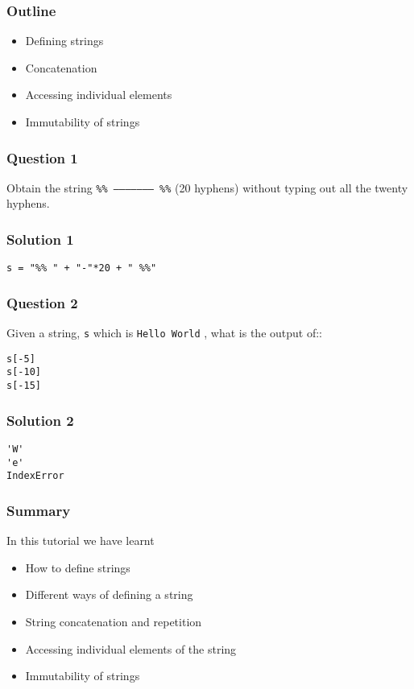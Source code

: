 \documentclass[presentation]{beamer}
\title{}
\author{FOSSEE}
\date{}
\begin{document}
\begin{frame}
\frametitle{Outline}
\label{sec-1}
\begin{itemize}

\item Defining strings\\
\label{sec-1_1}%
\item Concatenation\\
\label{sec-1_2}%
\item Accessing individual elements\\
\label{sec-1_3}%
\item Immutability of strings\\
\label{sec-1_4}%
\end{itemize} %
\end{frame}
\begin{frame}
\frametitle{Question 1}
\label{sec-2}

  Obtain the string \texttt{\%\% -------------------- \%\%} (20 hyphens) without
  typing out all the twenty hyphens.
\end{frame}
\begin{frame}[fragile]
\frametitle{Solution 1}
\label{sec-3}

\lstset{language=Python}
\begin{lstlisting}
s = "%% " + "-"*20 + " %%"
\end{lstlisting}
\end{frame}
\begin{frame}[fragile]
\frametitle{Question 2}
\label{sec-4}

  Given a string, \texttt{s} which is \texttt{Hello World} , what is the output of::
\lstset{language=Python}
\begin{lstlisting}
s[-5] 
s[-10]
s[-15]
\end{lstlisting}
\end{frame}
\begin{frame}[fragile]
\frametitle{Solution 2}
\label{sec-5}

\lstset{language=Python}
\begin{lstlisting}
'W'
'e'
IndexError
\end{lstlisting}
\end{frame}
\begin{frame}
\frametitle{Summary}
\label{sec-6}

  In this tutorial we have learnt
\begin{itemize}
\item How to define strings
\item Different ways of defining a string
\item String concatenation and repetition
\item Accessing individual elements of the string
\item Immutability of strings
\end{itemize}

  
\end{frame}
\end{document}
